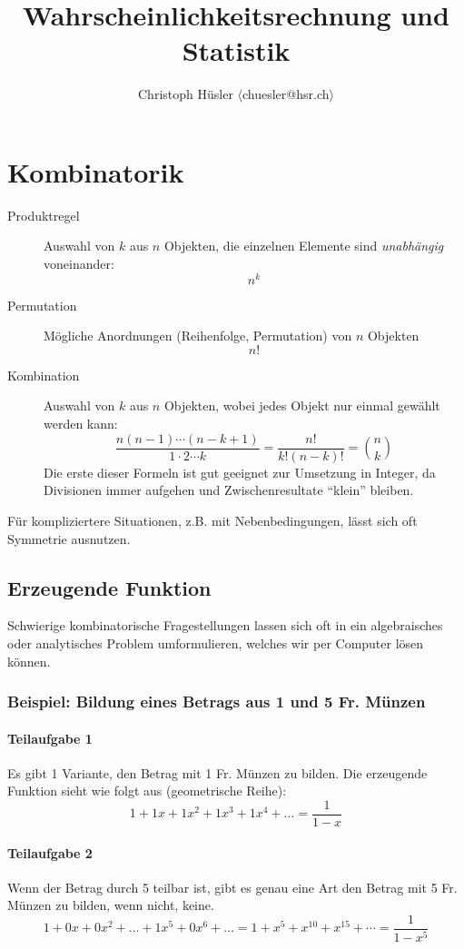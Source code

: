 \documentclass[10pt,a4paper]{scrartcl}
\title{Wahrscheinlichkeitsrechnung und Statistik}
\author{Christoph H\"usler $\langle$chuesler@hsr.ch$\rangle$ }
\newif\ifincludeExamples
\begin{document}
\maketitle
\section{Kombinatorik}
\begin{description}
\item[Produktregel] Auswahl von $k$ aus $n$ Objekten, die einzelnen Elemente sind \emph{unabhängig} voneinander: $$n^k$$
\item[Permutation] Mögliche Anordnungen (Reihenfolge, Permutation) von $n$ Objekten $$n!$$
\item[Kombination] Auswahl von $k$ aus $n$ Objekten, wobei jedes Objekt nur einmal gewählt werden kann:
    $$\frac{n(n-1)\cdots(n-k+1)}{1 \cdot 2 \cdots k} = \frac{n!}{k!(n-k)!} = \binom{n}{k}$$
    Die erste dieser Formeln ist gut geeignet zur Umsetzung in Integer, da Divisionen immer aufgehen und Zwischenresultate ``klein'' bleiben.
\end{description}

Für kompliziertere Situationen, z.B. mit Nebenbedingungen, lässt sich oft Symmetrie ausnutzen.

\ifincludeExamples
\subsection{Erzeugende Funktion}
Schwierige kombinatorische Fragestellungen lassen sich oft in ein algebraisches oder analytisches Problem umformulieren, welches wir per Computer lösen können.

\subsubsection{Beispiel: Bildung eines Betrags aus 1 und 5 Fr. Münzen} 
\paragraph{Teilaufgabe 1} Es gibt 1 Variante, den Betrag mit 1 Fr. Münzen zu bilden.
Die erzeugende Funktion sieht wie folgt aus (geometrische Reihe): $$1 + 1x + 1x^2 + 1x^3 + 1x^4 + \dots = \frac{1}{1-x}$$ 

\paragraph{Teilaufgabe 2} Wenn der Betrag durch 5 teilbar ist, gibt es genau eine Art den Betrag mit 5 Fr. Münzen zu bilden, wenn nicht, keine.
$$1 + 0x + 0x^2 + \dots + 1x^5 + 0x^6 + \dots  = 1 + x^5 + x^{10} + x^{15} + \cdots = \frac{1}{1-x^5}$$
\end{document}
